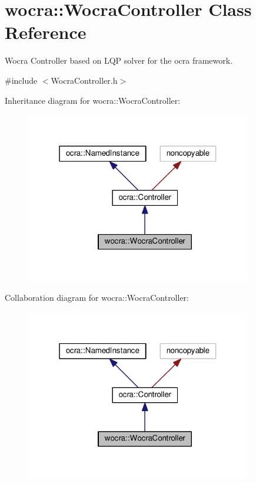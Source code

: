 \hypertarget{classwocra_1_1WocraController}{}\section{wocra\+:\+:Wocra\+Controller Class Reference}
\label{classwocra_1_1WocraController}


Wocra Controller based on L\+QP solver for the ocra framework.  




{\ttfamily \#include $<$Wocra\+Controller.\+h$>$}



Inheritance diagram for wocra\+:\+:Wocra\+Controller\+:
\nopagebreak
\begin{figure}[H]
\begin{center}
\leavevmode
\includegraphics[width=280pt]{d9/d5a/classwocra_1_1WocraController__inherit__graph}
\end{center}
\end{figure}


Collaboration diagram for wocra\+:\+:Wocra\+Controller\+:
\nopagebreak
\begin{figure}[H]
\begin{center}
\leavevmode
\includegraphics[width=280pt]{df/db8/classwocra_1_1WocraController__coll__graph}
\end{center}
\end{figure}
